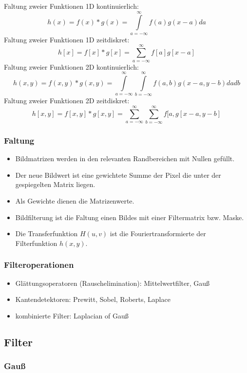 Faltung zweier Funktionen 1D kontinuierlich: $$h(x) = f(x) * g(x) = \int\limits_{a = - \infty}^{\infty} f(a) g(x-a) da$$
Faltung zweier Funktionen 1D zeitdiskret: $$h[x] = f[x] * g[x] = \sum\limits_{a = - \infty}^{\infty} f[a] g[x-a]$$
Faltung zweier Funktionen 2D kontinuierlich: $$h(x,y) = f(x,y) * g(x,y) = \int\limits_{a = -\infty}^{\infty} \int\limits_{b = -\infty}^{\infty} f(a,b) g(x-a,y-b) dadb$$
Faltung zweier Funktionen 2D zeitdiskret: $$h[x,y] = f[x,y] * g[x,y] = \sum\limits_{a = -\infty}^{\infty} \sum\limits_{b = -\infty}^{\infty} f[a, g[x-a,y-b]$$

\subsubsection*{Faltung}

\begin{itemize}
\item Bildmatrizen werden in den relevanten Randbereichen mit Nullen gefüllt.
\item Der neue Bildwert ist eine gewichtete Summe der Pixel die unter der gespiegelten Matrix liegen.
\item Als Gewichte dienen die Matrizenwerte.
\item Bildfilterung ist die Faltung einen Bildes mit einer Filtermatrix bzw. Maske.
\item Die Transferfunktion $H(u,v)$ ist die Fouriertransformierte der Filterfunktion $h(x,y)$.
\end{itemize}

\subsubsection*{Filteroperationen}

\begin{itemize}
\item Glättungsoperatoren (Rauschelimination): Mittelwertfilter, Gauß
\item Kantendetektoren: Prewitt, Sobel, Roberts, Laplace
\item kombinierte Filter: Laplacian of Gauß
\end{itemize}

\subsection{Filter}

\subsubsection*{Gauß}

